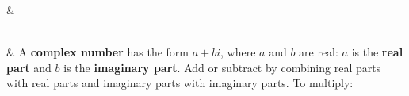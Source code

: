 \documentclass[10pt]{article}
\begin{document}
\begin{guidednotes}
\begin{probgrid}
 &
 \\ \hline
\end{probgrid}
\\ \hline
 &
A \textbf{complex number} has the form $a + bi$, where $a$ and $b$ are real: $a$ is the
\textbf{real part} and $b$ is the \textbf{imaginary part}. Add or subtract by combining real
parts with real parts and imaginary parts with imaginary parts. To multiply:


\end{guidednotes}
\end{document}
